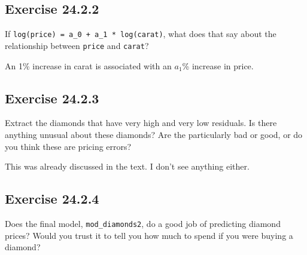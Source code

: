 \documentclass[]{book}
\newenvironment{Shaded}{\begin{snugshade}}{\end{snugshade}}
\newcommand{\CommentTok}[1]{\textcolor[rgb]{0.56,0.35,0.01}{\textit{#1}}}
\newcommand{\DataTypeTok}[1]{\textcolor[rgb]{0.13,0.29,0.53}{#1}}
\newcommand{\DecValTok}[1]{\textcolor[rgb]{0.00,0.00,0.81}{#1}}
\newcommand{\FloatTok}[1]{\textcolor[rgb]{0.00,0.00,0.81}{#1}}
\newcommand{\KeywordTok}[1]{\textcolor[rgb]{0.13,0.29,0.53}{\textbf{#1}}}
\newcommand{\NormalTok}[1]{#1}
\newcommand{\OperatorTok}[1]{\textcolor[rgb]{0.81,0.36,0.00}{\textbf{#1}}}
\newcommand{\StringTok}[1]{\textcolor[rgb]{0.31,0.60,0.02}{#1}}
\theoremstyle{plain}
\theoremstyle{remark}
\theoremstyle{definition}
\theoremstyle{definition}
\theoremstyle{definition}
\theoremstyle{remark}
\begin{document}
\hypertarget{exercise-24.2.2}{%
\subsection*{\texorpdfstring{Exercise
{24.2.2}}{Exercise 24.2.2}}\label{exercise-24.2.2}}

If \texttt{log(price)\ =\ a\_0\ +\ a\_1\ *\ log(carat)}, what does that
say about the relationship between \texttt{price} and \texttt{carat}?

An 1\% increase in carat is associated with an \(a_1\)\% increase in
price.

\hypertarget{exercise-24.2.3}{%
\subsection*{\texorpdfstring{Exercise
{24.2.3}}{Exercise 24.2.3}}\label{exercise-24.2.3}}

Extract the diamonds that have very high and very low residuals. Is
there anything unusual about these diamonds? Are the particularly bad or
good, or do you think these are pricing errors?

This was already discussed in the text. I don't see anything either.

\hypertarget{exercise-24.2.4}{%
\subsection*{\texorpdfstring{Exercise
{24.2.4}}{Exercise 24.2.4}}\label{exercise-24.2.4}}

Does the final model, \texttt{mod\_diamonds2}, do a good job of
predicting diamond prices? Would you trust it to tell you how much to
spend if you were buying a diamond?

\begin{Shaded}
\end{Shaded}
\end{document}
